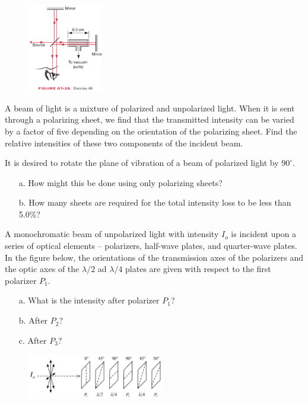 \documentclass[11pt,letterpaper,boxed]{pset}
\begin{document}
    \begin{figure} [ht]
        \includegraphics[width=125px]{HW12Images/E41-40.png}
    \end{figure}
    \newpage
    
    \begin{problem} [P44.2]
        A beam of light is a mixture of polarized and unpolarized light. When it is sent through a polarizing sheet, we find that the transmitted intensity can be varied by a factor of five depending on the orientation of the polarizing sheet. Find the relative intensities of these two components of the incident beam.
    \end{problem}
    \newpage
    
    \begin{problem} [P44.4]
        It is desired to rotate the plane of vibration of a beam of polarized light by $90^{\circ}$.
        
        \begin{enumerate}
            \item [a.] How might this be done using only polarizing sheets?
            \item [b.] How many sheets are required for the total intensity loss to be less than 5.0\%?
        \end{enumerate}
    \end{problem}
    \newpage
    
    \begin{problem} [SUP12.1]
        A monochromatic beam of unpolarized light with intensity $I_o$ is incident upon a series of optical elements -- polarizers, half-wave plates, and quarter-wave plates. In the figure below, the orientations of the transmission axes of the polarizers and the optic axes of the $\lambda/2$ ad $\lambda/4$ plates are given with respect to the first polarizer $P_1$.
        
        \begin{enumerate}
            \item [a.] What is the intensity after polarizer $P_1$?
            \item [b.] After $P_2$?
            \item [c.] After $P_3$?
        \end{enumerate}
    \end{problem}
    
    \begin{figure} [ht]
        \includegraphics[width=225px]{HW12Images/SUP12-1.png}
    \end{figure}
\end{document}
